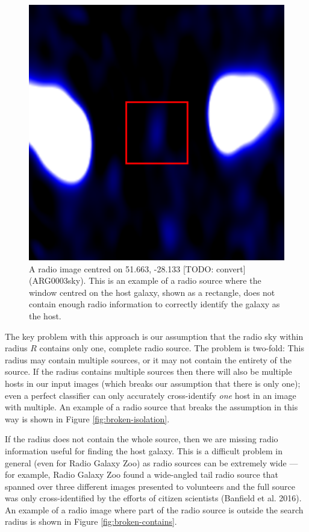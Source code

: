 \documentclass[fleqn,usenatbib,usedcolumn]{mnras}
\begin{document}
    \begin{figure}
      \centering
      \includegraphics[width=0.5\linewidth]{images/ARG0003sky_radio.eps}
      \caption{A radio image centred on 51.663, -28.133 [TODO: convert]
        (ARG0003sky). This is an example of a radio source where the window
        centred on the host galaxy, shown as a rectangle, does not contain
        enough radio information to correctly identify the galaxy as the
        host.}
      \label{fig:broken-window-size}
    \end{figure}

    The key problem with this approach is our assumption that the radio sky
    within radius $R$ contains only one, complete radio source. The problem is
    two-fold: This radius may contain multiple sources, or it may not contain
    the entirety of the source. If the radius contains multiple sources then
    there will also be multiple hosts in our input images (which breaks our
    assumption that there is only one); even a perfect classifier can only
    accurately cross-identify \emph{one} host in an image with multiple. An
    example of a radio source that breaks the assumption in this way is shown
    in Figure \ref{fig:broken-isolation}.

    If the radius does not contain the whole source, then we are missing radio
    information useful for finding the host galaxy. This is a difficult
    problem in general (even for Radio Galaxy Zoo) as radio sources can be
    extremely wide --- for example, Radio Galaxy Zoo found a wide-angled tail
    radio source that spanned over three different images presented to
    volunteers and the full source was only cross-identified by the efforts of
    citizen scientists (Banfield et al. 2016). An example of a radio image
    where part of the radio source is outside the search radius is shown in
    Figure \ref{fig:broken-contains}.
\end{document}
